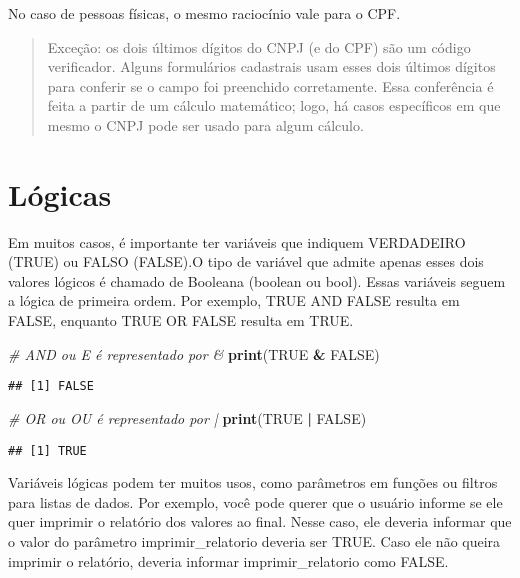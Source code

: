 \documentclass[
]{book}
\newenvironment{Shaded}{\begin{snugshade}}{\end{snugshade}}
\newcommand{\CommentTok}[1]{\textcolor[rgb]{0.56,0.35,0.01}{\textit{#1}}}
\newcommand{\KeywordTok}[1]{\textcolor[rgb]{0.13,0.29,0.53}{\textbf{#1}}}
\newcommand{\NormalTok}[1]{#1}
\newcommand{\OperatorTok}[1]{\textcolor[rgb]{0.81,0.36,0.00}{\textbf{#1}}}
\newcommand{\OtherTok}[1]{\textcolor[rgb]{0.56,0.35,0.01}{#1}}
\newcommand{\StringTok}[1]{\textcolor[rgb]{0.31,0.60,0.02}{#1}}
\begin{document}
No caso de pessoas físicas, o mesmo raciocínio vale para o CPF.

\begin{quote}
Exceção: os dois últimos dígitos do CNPJ (e do CPF) são um código verificador. Alguns formulários cadastrais usam esses dois últimos dígitos para conferir se o campo foi preenchido corretamente. Essa conferência é feita a partir de um cálculo matemático; logo, há casos específicos em que mesmo o CNPJ pode ser usado para algum cálculo.
\end{quote}

\hypertarget{luxf3gicas}{%
\section{Lógicas}\label{luxf3gicas}}

Em muitos casos, é importante ter variáveis que indiquem VERDADEIRO (TRUE) ou FALSO (FALSE).O tipo de variável que admite apenas esses dois valores lógicos é chamado de Booleana (boolean ou bool). Essas variáveis seguem a lógica de primeira ordem. Por exemplo, TRUE AND FALSE resulta em FALSE, enquanto TRUE OR FALSE resulta em TRUE.

\begin{Shaded}
\begin{Highlighting}[]
\CommentTok{# AND ou E é representado por &}
\KeywordTok{print}\NormalTok{(}\OtherTok{TRUE} \OperatorTok{&}\StringTok{ }\OtherTok{FALSE}\NormalTok{)}
\end{Highlighting}
\end{Shaded}

\begin{verbatim}
## [1] FALSE
\end{verbatim}

\begin{Shaded}
\begin{Highlighting}[]
\CommentTok{# OR ou OU é representado por |}
\KeywordTok{print}\NormalTok{(}\OtherTok{TRUE} \OperatorTok{|}\StringTok{ }\OtherTok{FALSE}\NormalTok{) }
\end{Highlighting}
\end{Shaded}

\begin{verbatim}
## [1] TRUE
\end{verbatim}

Variáveis lógicas podem ter muitos usos, como parâmetros em funções ou filtros para listas de dados. Por exemplo, você pode querer que o usuário informe se ele quer imprimir o relatório dos valores ao final. Nesse caso, ele deveria informar que o valor do parâmetro imprimir\_relatorio deveria ser TRUE. Caso ele não queira imprimir o relatório, deveria informar imprimir\_relatorio como FALSE.
\end{document}
